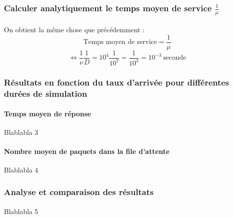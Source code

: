            \subsubsection{Calculer analytiquement le temps moyen de service $\frac{1}{\mu}$}
%
                \paragraph{}
On obtient la même chose que précédemment :
\[  \text{Temps moyen de service} = \frac{1}{\mu} \]
\[ \iff \frac{1}{\nu} \frac{1}{D} = 10^{4} \frac{1}{10^{7}} = \frac{1}{10^{3}} = 10^{-3} \ \text{seconde} \]
%
            \subsubsection{Résultats en fonction du taux d'arrivée pour différentes durées de simulation}
%
%
                \paragraph{Temps moyen de réponse}
Blablabla 3
%
                \paragraph{Nombre moyen de paquets dans la file d'attente}
Blablabla 4
%
            \subsubsection{Analyse et comparaison des résultats}
%
                \paragraph{}
Blablabla 5

%
    \clearpage
%
